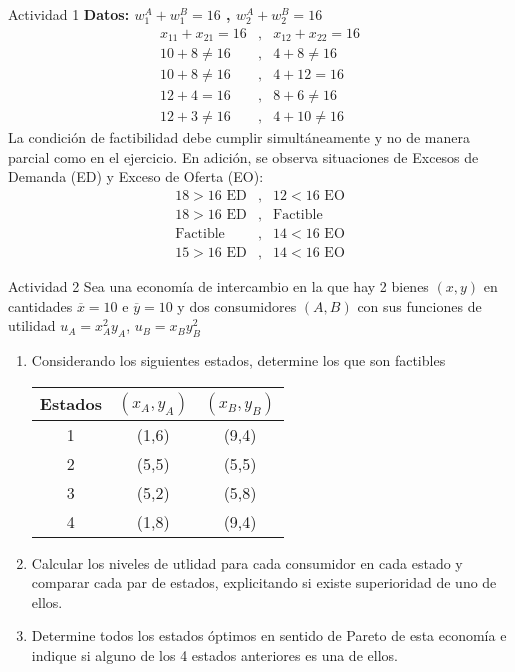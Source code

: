 \begin{frame}{Actividad 1}
	\textbf{Datos: $w_{1}^{A} + w_{1}^{B} = 16$ , $w_{2}^{A} + w_{2}^{B}=16$}
		$$\begin{array}{ccc}
			x_{11} + x_{21}=16 & , & x_{12} + x_{22}=16\\[0.2cm]
			10 + 8 \neq 16 & , & 4 + 8  \neq 16\\
			10 + 8 \neq 16 & , & 4 + 12 = 16\\
			12 + 4 = 16    & , & 8 + 6  \neq 16\\
			12 + 3 \neq 16 & , & 4 + 10 \neq 16
		\end{array}$$
	La condición de factibilidad debe cumplir simultáneamente y no de manera parcial como en el ejercicio. En adición, se observa situaciones de Excesos de Demanda (ED) y Exceso de Oferta (EO):
		$$\begin{array}{ccc}
			18 > 16 \text{ ED} & , & 12 < 16 \text{ EO} \\
			18 > 16 \text{ ED} & , & \text{Factible}    \\
			\text{Factible}    & , & 14 < 16 \text{ EO} \\
			15 > 16 \text{ ED} & , & 14 < 16 \text{ EO}
		\end{array}$$
\end{frame}
\begin{frame}{Actividad 2}
	Sea una economía de intercambio en la que hay 2 bienes $(x, y)$ en cantidades $\overline{x}=10$ e $\overline{y}=10$ y dos consumidores $(A, B)$ con sus funciones de utilidad $u_{A}=x_{A}^{2}y_{A}$,  $u_{B}=x_{B}y_{B}^{2}$
		\begin{enumerate}
			\item Considerando los siguientes estados, determine los que son factibles\\
				\begin{table}
					\centering
						\begin{tabular}{|c|c|c|}
								\hline
							Estados & $\left( x_{A},y_{A}\right)$ & $\left( x_{B},y_{B}\right)$ \\
								\hline
							1 & (1,6) & (9,4) \\
							2 & (5,5) & (5,5) \\
							3 & (5,2) & (5,8) \\
							4 & (1,8) & (9,4) \\
								\hline
						\end{tabular}
				\end{table}
			\item Calcular los niveles de utlidad para cada consumidor en cada estado y comparar cada par de estados, explicitando si existe superioridad de uno de ellos.
			\item Determine todos los estados óptimos en sentido de Pareto de esta economía e indique si alguno de los 4 estados anteriores es una de ellos.
		\end{enumerate}
\end{frame}

